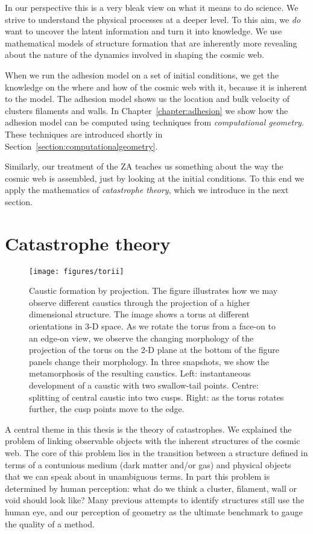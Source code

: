 In our perspective this is a very bleak view on what it means to do science. We strive to understand the physical processes at a deeper level. To this aim, we \emph{do} want to uncover the latent information and turn it into knowledge. We use mathematical models of structure formation that are inherently more revealing about the nature of the dynamics involved in shaping the cosmic web.

When we run the adhesion model on a set of initial conditions, we get the knowledge on the where and how of the cosmic web with it, because it is inherent to the model. The adhesion model shows us the location and bulk velocity of clusters filaments and walls. In Chapter~\ref{chapter:adhesion} we show how the adhesion model can be computed using techniques from \emph{computational geometry}. These techniques are introduced shortly in Section~\ref{section:computationalgeometry}.

Similarly, our treatment of the \ac{ZA} teaches us something about the way the cosmic web is assembled, just by looking at the initial conditions. To this end we apply the mathematics of \emph{catastrophe theory}, which we introduce in the next section.


\clearpage
\section{Catastrophe theory}\label{section:catastrophetheory}
\begin{figure}
    \centering
    \centerline{\texttt{[image: figures/torii]}}
    \caption{Caustic formation by projection. The figure illustrates how we may observe different caustics through the projection of a higher dimensional structure. The image shows a torus at different orientations in 3-D space. As we rotate the torus from a face-on to an edge-on view, we observe the changing morphology of the projection of the torus on the 2-D plane at the bottom of the figure panels change their morphology. In three snapshots, we show the metamorphosis of the resulting caustics. Left: instantaneous development of a caustic with two swallow-tail points. Centre: splitting of central caustic into two cusps. Right: as the torus rotates further, the cusp points move to the edge.}\label{fig:torus_intro}
\end{figure}

A central theme in this thesis is the theory of catastrophes. We explained the problem of linking observable objects with the inherent structures of the cosmic web. The core of this problem lies in the transition between a structure defined in terms of a contunious medium (dark matter and/or gas) and physical objects that we can speak about in unambiguous terms. In part this problem is determined by human perception: what do we think a cluster, filament, wall or void should look like? Many previous attempts to identify structures still use the human eye, and our perception of geometry as the ultimate benchmark to gauge the quality of a method.

